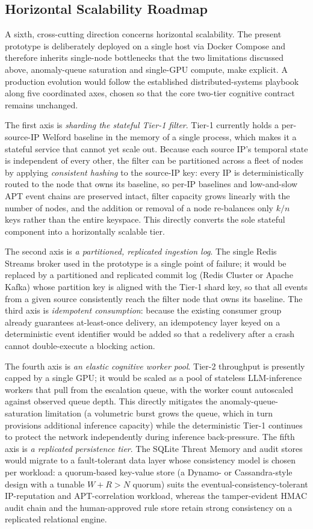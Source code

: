 \subsection{Horizontal Scalability Roadmap}
A sixth, cross-cutting direction concerns horizontal scalability. The present prototype is deliberately deployed on a single host via Docker Compose and therefore inherits single-node bottlenecks that the two limitations discussed above, anomaly-queue saturation and single-GPU compute, make explicit. A production evolution would follow the established distributed-systems playbook along five coordinated axes, chosen so that the core two-tier cognitive contract remains unchanged.

The first axis is \textit{sharding the stateful Tier-1 filter}. Tier-1 currently holds a per-source-IP Welford baseline in the memory of a single process, which makes it a stateful service that cannot yet scale out. Because each source IP's temporal state is independent of every other, the filter can be partitioned across a fleet of nodes by applying \emph{consistent hashing} to the source-IP key: every IP is deterministically routed to the node that owns its baseline, so per-IP baselines and low-and-slow APT event chains are preserved intact, filter capacity grows linearly with the number of nodes, and the addition or removal of a node re-balances only $k/n$ keys rather than the entire keyspace. This directly converts the sole stateful component into a horizontally scalable tier.

The second axis is \textit{a partitioned, replicated ingestion log}. The single Redis Streams broker used in the prototype is a single point of failure; it would be replaced by a partitioned and replicated commit log (Redis Cluster or Apache Kafka) whose partition key is aligned with the Tier-1 shard key, so that all events from a given source consistently reach the filter node that owns its baseline. The third axis is \textit{idempotent consumption}: because the existing consumer group already guarantees at-least-once delivery, an idempotency layer keyed on a deterministic event identifier would be added so that a redelivery after a crash cannot double-execute a blocking action.

The fourth axis is \textit{an elastic cognitive worker pool}. Tier-2 throughput is presently capped by a single GPU; it would be scaled as a pool of stateless LLM-inference workers that pull from the escalation queue, with the worker count autoscaled against observed queue depth. This directly mitigates the anomaly-queue-saturation limitation (a volumetric burst grows the queue, which in turn provisions additional inference capacity) while the deterministic Tier-1 continues to protect the network independently during inference back-pressure. The fifth axis is \textit{a replicated persistence tier}. The SQLite Threat Memory and audit stores would migrate to a fault-tolerant data layer whose consistency model is chosen per workload: a quorum-based key-value store (a Dynamo- or Cassandra-style design with a tunable $W+R>N$ quorum) suits the eventual-consistency-tolerant IP-reputation and APT-correlation workload, whereas the tamper-evident HMAC audit chain and the human-approved rule store retain strong consistency on a replicated relational engine.

